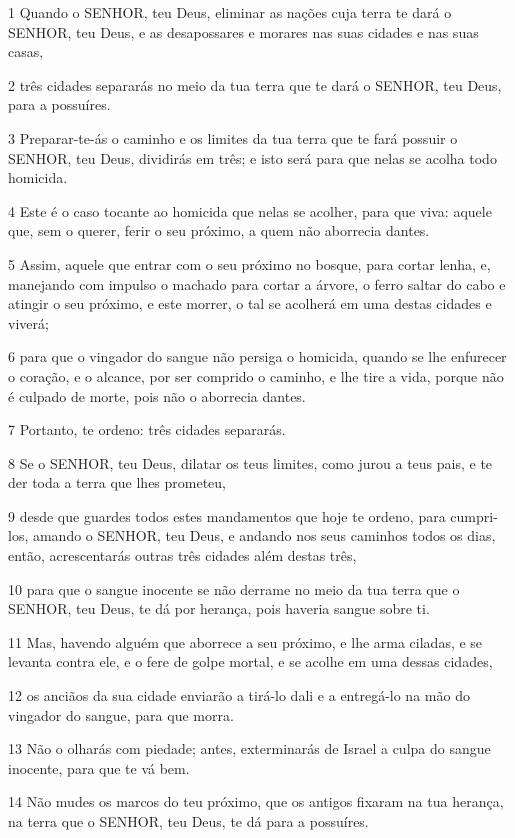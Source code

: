 \par 1 Quando o SENHOR, teu Deus, eliminar as nações cuja terra te dará o SENHOR, teu Deus, e as desapossares e morares nas suas cidades e nas suas casas,
\par 2 três cidades separarás no meio da tua terra que te dará o SENHOR, teu Deus, para a possuíres.
\par 3 Preparar-te-ás o caminho e os limites da tua terra que te fará possuir o SENHOR, teu Deus, dividirás em três; e isto será para que nelas se acolha todo homicida.
\par 4 Este é o caso tocante ao homicida que nelas se acolher, para que viva: aquele que, sem o querer, ferir o seu próximo, a quem não aborrecia dantes.
\par 5 Assim, aquele que entrar com o seu próximo no bosque, para cortar lenha, e, manejando com impulso o machado para cortar a árvore, o ferro saltar do cabo e atingir o seu próximo, e este morrer, o tal se acolherá em uma destas cidades e viverá;
\par 6 para que o vingador do sangue não persiga o homicida, quando se lhe enfurecer o coração, e o alcance, por ser comprido o caminho, e lhe tire a vida, porque não é culpado de morte, pois não o aborrecia dantes.
\par 7 Portanto, te ordeno: três cidades separarás.
\par 8 Se o SENHOR, teu Deus, dilatar os teus limites, como jurou a teus pais, e te der toda a terra que lhes prometeu,
\par 9 desde que guardes todos estes mandamentos que hoje te ordeno, para cumpri-los, amando o SENHOR, teu Deus, e andando nos seus caminhos todos os dias, então, acrescentarás outras três cidades além destas três,
\par 10 para que o sangue inocente se não derrame no meio da tua terra que o SENHOR, teu Deus, te dá por herança, pois haveria sangue sobre ti.
\par 11 Mas, havendo alguém que aborrece a seu próximo, e lhe arma ciladas, e se levanta contra ele, e o fere de golpe mortal, e se acolhe em uma dessas cidades,
\par 12 os anciãos da sua cidade enviarão a tirá-lo dali e a entregá-lo na mão do vingador do sangue, para que morra.
\par 13 Não o olharás com piedade; antes, exterminarás de Israel a culpa do sangue inocente, para que te vá bem.
\par 14 Não mudes os marcos do teu próximo, que os antigos fixaram na tua herança, na terra que o SENHOR, teu Deus, te dá para a possuíres.
